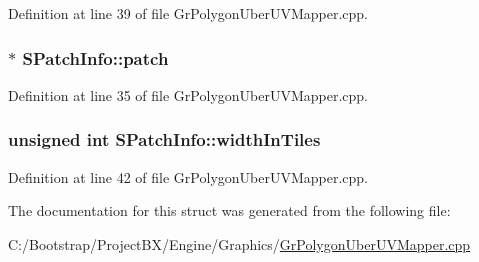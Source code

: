 Definition at line 39 of file GrPolygonUberUVMapper.cpp.\hypertarget{struct_s_patch_info_91b27df287e15a05ccb21a23b9ab7346}{
\subsubsection[{patch}]{$\ast$ {\bf SPatchInfo::patch}}}
\label{struct_s_patch_info_91b27df287e15a05ccb21a23b9ab7346}




Definition at line 35 of file GrPolygonUberUVMapper.cpp.\hypertarget{struct_s_patch_info_71b540a6a51523516098c78ebc36868e}{
\subsubsection[{widthInTiles}]{\setlength{\rightskip}{0pt plus 5cm}unsigned int {\bf SPatchInfo::widthInTiles}}}
\label{struct_s_patch_info_71b540a6a51523516098c78ebc36868e}




Definition at line 42 of file GrPolygonUberUVMapper.cpp.

The documentation for this struct was generated from the following file:\begin{CompactItemize}
\item 
C:/Bootstrap/ProjectBX/Engine/Graphics/\hyperlink{_gr_polygon_uber_u_v_mapper_8cpp}{GrPolygonUberUVMapper.cpp}\end{CompactItemize}
